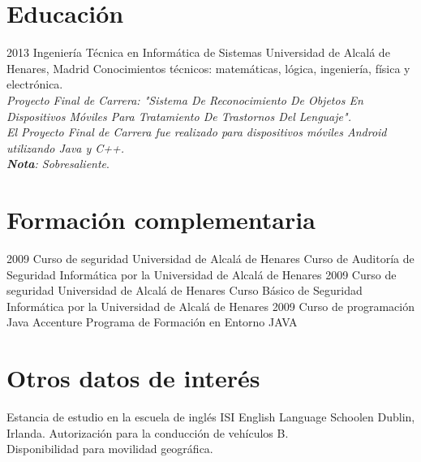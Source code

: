 \documentclass[]{friggeri-cv}
\begin{document}
\section{Educación}
\begin{entrylist}
  \entry
    {2013}
    {Ingeniería Técnica en Informática de Sistemas}
    {Universidad de Alcalá de Henares, Madrid}
    {Conocimientos técnicos: matemáticas, lógica, ingeniería, física y electrónica.\\
    \emph{Proyecto Final de Carrera: "Sistema De Reconocimiento De Objetos En Dispositivos Móviles Para Tratamiento De Trastornos Del Lenguaje".}\\
    \emph{El Proyecto Final de Carrera fue realizado para dispositivos móviles Android utilizando Java y C++.\\ \textbf{Nota}: Sobresaliente}.}
{}   
\end{entrylist}

\section{Formación complementaria}
\begin{entrylist}
\entry
    {2009}
    {Curso de seguridad}
    {Universidad de Alcalá de Henares}
    {Curso de Auditoría de Seguridad Informática por la Universidad de Alcalá de Henares}{}
   \entry
    {2009}
    {Curso de seguridad}
    {Universidad de Alcalá de Henares}
    {Curso Básico de Seguridad Informática por la Universidad de Alcalá de Henares}
{}   \entry
    {2009}
    {Curso de programación Java}
    {Accenture}
    {Programa de Formación en Entorno JAVA}
{}
\end{entrylist}


\section{Otros datos de interés}
\begin{entrylist}
\entry
    {}
    {Estancia de estudio en la escuela de inglés ISI English Language Schoolen Dublin, Irlanda.}
    {}{Autorización para la conducción de vehículos B.\\
    Disponibilidad para movilidad geográfica.}
    {}
\end{entrylist}
\end{document}
